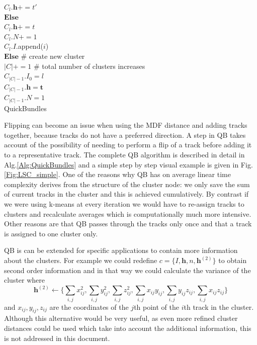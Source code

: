\documentclass[preprint,authoryear,a4paper,10pt,onecolumn]{elsarticle}
\begin{document}
\begin{algorithm}
\hspace*{4em} $C_{l}.\mathbf{h}+=t'$\\
\hspace*{2em} $\textbf{Else}$ \\
\hspace*{4em} $C_{l}.\mathbf{h}+=t$\\
\hspace*{2em} $C_{l}.N+=1$\\
\hspace*{2em} $C_{l}.I$.append($i$)\\
$\textbf{Else}$ \# create new cluster\\
\hspace*{2em} $|C|+=1$ \# total number of clusters increases\\
\hspace*{2em} $C_{|C|-1}.I_{0}=l$\\
\hspace*{2em} $C_{|C|-1}.\mathbf{h}=\mathbf{t}$\\
\hspace*{2em} $C_{|C|-1}.N=1$\\
\caption{QuickBundles}

\label{Alg:QuickBundles}
\end{algorithm}


Flipping can become an issue when using the MDF distance and adding
tracks together, because tracks do not have a preferred direction.
A step in QB takes account of the possibility of needing to perform
a flip of a track before adding it to a representative track. The
complete QB algorithm is described in detail in Alg.\ref{Alg:QuickBundles}
and a simple step by step visual example is given in Fig.\ref{Fig:LSC_simple}.
One of the reasons why QB has on average linear time complexity derives
from the structure of the cluster node: we only save the sum of current
tracks in the cluster and this is achieved cumulatively. By contrast
if we were using k-means at every iteration we would have to re-assign
tracks to clusters and recalculate averages which is computationally
much more intensive. Other reasons are that QB passes through the
tracks only once and that a track is assigned to one cluster only. 

QB is can be extended for specific applications to contain more information
about the clusters. For example we could redefine $c=\{I,\mathbf{h},n,\mathbf{h}^{(2)}\}$
to obtain second order information and in that way we could calculate
the variance of the cluster where \[
\mathbf{h}^{(2)}\leftarrow\{\sum_{i,j}x_{ij}^{2},\sum_{i,j}y_{ij}^{2},\sum_{i,j}z_{ij}^{2},\sum_{i,j}x_{ij}y_{ij},\sum_{i,j}y_{ij}z_{ij},\sum_{i,j}x_{ij}z_{ij}\}\]
 and $x_{ij},y_{ij},z_{ij}$ are the coordinates of the $j$th point
of the $i$th track in the cluster. Although this alternative would
be very useful, as even more refined cluster distances could be used
which take into account the additional information, this is not addressed
in this document.
\end{document}
